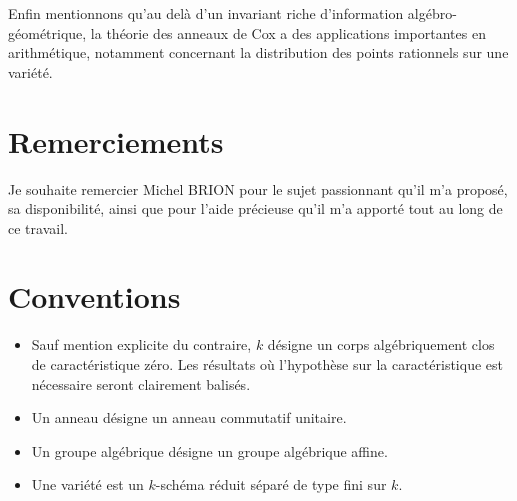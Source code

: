 Enfin mentionnons qu'au delà d'un invariant riche d'information algébro-géométrique, la théorie des anneaux de Cox a des applications importantes en arithmétique, notamment concernant la distribution des points rationnels sur une variété.



\section*{Remerciements}

Je souhaite remercier Michel BRION pour le sujet passionnant qu'il m'a proposé, sa disponibilité, ainsi que pour l'aide précieuse qu'il m'a apporté tout au long de ce travail.

\section*{Conventions}
\label{conventions}

\begin{itemize}
\item Sauf mention explicite du contraire, $k$ désigne un corps algébriquement clos de caractéristique zéro. Les résultats où l'hypothèse sur la caractéristique est nécessaire seront clairement balisés.
\item Un anneau désigne un anneau commutatif unitaire.
\item Un groupe algébrique désigne un groupe algébrique affine.
\item Une variété est un $k$-schéma réduit séparé de type fini sur $k$.
\end{itemize}


